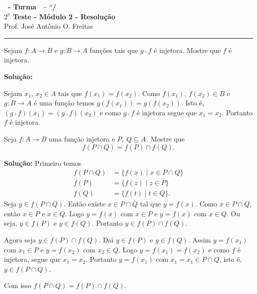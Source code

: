 \documentclass[12pt]{exam}
\begin{document}
\begin{center}
{\Large\bf \disciplina\ - Turma \turma\ -- \semestre$^{o}$/\ano} \\ \vspace{9pt} {\large\bf
$2^{\underline{o}}$ Teste - M\'odulo 2 - Resolu\c{c}\~ao}\\
\vspace{9pt} Prof. Jos{\'e} Ant{\^o}nio O. Freitas
\end{center}
\hrule

\vspace{.6cm}

\questao Sejam $f : A \to B$ e $g : B \to A$ fun\c{c}\~oes tais que $g \comp f$ \'e injetora. Mostre que $f$ \'e injetora.

\noindent\textbf{Solu\c{c}\~ao:}

	Sejam $x_1$, $x_2 \in A$ tais que $f(x_1) = f(x_2)$. Como $f(x_1)$, $f(x_2) \in B$ e $g : B \to A$ \'e uma fun\c{c}\~ao temos $g(f(x_1)) = g(f(x_2))$. Isto \'e, $(g \comp f)(x_1) = (g \comp f)(x_2)$ e como $g \comp f$ \'e injetora segue que $x_1 = x_2$. Portanto $f$ \'e injetora.

\vspace{.5cm}

\questao Seja $f : A \to B$ uma fun\c{c}\~ao injetora e $P$, $Q \subseteq A$. Mostre que
\[
	f(P \cap Q) = f(P) \cap f(Q).
\]

\noindent\textbf{Solu\c{c}\~ao:} Primeiro temos
\begin{align*}
	f(P \cap Q) &= \{f(x) \mid x \in P \cap Q\}\\
	f(P) &= \{f(z) \mid z \in P\}\\
	f(Q) &= \{f(t) \mid t \in Q\}.
\end{align*}
Seja $y \in f(P \cap Q)$. Ent\~ao existe $x \in P \cap Q$ tal que $y = f(x)$. Como $x \in P \cap Q$, ent\~ao $x \in P$ e $x \in Q$. Logo $y = f(x)$ com $x \in P$ e $y = f(x)$ com $x \in Q$. Ou seja, $y \in f(P)$ e $y \in f(Q)$. Portanto $y \in f(P) \cap f(Q)$.

Agora seja $y \in f(P) \cap f(Q)$. Da{\'\i} $y \in f(P)$ e $y \in f(Q)$. Assim $y = f(x_1)$ com $x_1 \in P$ e $y = f(x_2)$ com $x_2 \in Q$. Logo $y = f(x_1) = f(x_2)$ e como $f$ \'e injetora, segue que $x_1 = x_2$. Portanto $y = f(x_1)$ com $x_1 = x_1 \in P \cap Q$, isto \'e, $y \in f(P \cap Q)$.

Com isso $f(P \cap Q) = f(P) \cap f(Q)$.
\end{document}
